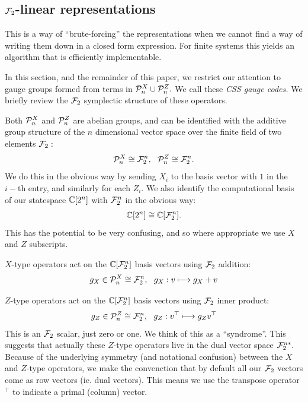 \def\Im{\mathrm{im}}
\def\Ker{\mathrm{ker}}
\def\Span#1{\langle #1 \rangle}

\subsection{$\mathcal{F}_2$-linear representations}

This is a way of ``brute-forcing'' the representations when
we cannot find a way of writing them down in a closed form expression.
For finite systems this yields an algorithm that is efficiently implementable.

In this section, and the remainder of this paper,
we restrict our
attention to gauge groups formed from terms 
in $\mathcal{P}_n^X\cup\mathcal{P}_n^Z.$
We call these \emph{CSS gauge codes.}
We briefly review the $\mathcal{F}_2$ symplectic structure of
these operators.

Both $\mathcal{P}^X_n$ and $\mathcal{P}^Z_n$ are abelian groups,
and can be identified with the additive 
group structure of the $n$ dimensional vector space
over the finite field of two elements $\mathcal{F}_2:$
$$
    \Pauli^X_n \cong \Fn,  \ \ 
    \Pauli^Z_n \cong \Fn. 
$$
We do this in the obvious way by sending $X_i$ to the basis vector with
$1$ in the $i-$th entry, and similarly for each $Z_i$. 
We also identify the computational basis of our statespace $\mathbb{C}[2^n]$
with $\mathcal{F}_2^n$ in the obvious way:
$$
\mathbb{C}[2^n] \cong \mathbb{C}[\mathcal{F}_2^n].
$$
This has the potential to be very confusing, and
so where appropriate we use $X$ and $Z$ subscripts.

$X$-type operators act on the $\mathbb{C}[\mathcal{F}_2^n]$
basis vectors using $\mathcal{F}_2$ addition:
$$
    g_X \in \mathcal{P}^X_n \cong \mathcal{F}_2^n, \ \ g_X : v \longmapsto g_X + v
$$

$Z$-type operators act on the
$\mathbb{C}[\mathcal{F}_2^n]$ basis vectors using $\mathcal{F}_2$ inner product:
$$
    g_Z \in \Pauli^Z_n \cong \Fn, \ \ g_Z : v^\top \longmapsto g_Z v^\top
$$
This is an $\mathcal{F}_2$ scalar, just zero or one. We think of this
as a ``syndrome''.
This suggests that actually these $Z$-type operators
live in the dual vector space $\mathcal{F}_2^{n*}.$
Because of the underlying symmetry
(and notational confusion)
between the $X$ and $Z$-type operators,
we make the convenction that by default
all our $\mathcal{F}_2$ vectors come as row vectors (ie. dual vectors).
This means we use the transpose operator $^\top$ to
indicate a primal (column) vector.

